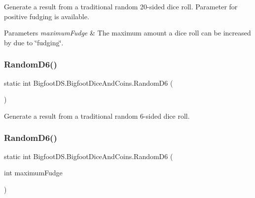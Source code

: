Generate a result from a traditional random 20-\/sided dice roll. Parameter for positive fudging is available. 


\begin{DoxyParams}{Parameters}
{\em maximum\+Fudge} & The maximum amount a dice roll can be increased by due to \char`\"{}fudging\char`\"{}.\\
\hline
\end{DoxyParams}
\mbox{\label{class_bigfoot_d_s_1_1_bigfoot_dice_and_coins_a20ea91b7328f0a2b36e5992ee9a0ccbb}} 
\subsubsection{\texorpdfstring{Random\+D6()}{RandomD6()}\hspace{0.1cm}{\footnotesize\ttfamily [1/2]}}
{\footnotesize\ttfamily static int Bigfoot\+D\+S.\+Bigfoot\+Dice\+And\+Coins.\+Random\+D6 (\begin{DoxyParamCaption}{ }\end{DoxyParamCaption})\hspace{0.3cm}{\ttfamily [static]}}



Generate a result from a traditional random 6-\/sided dice roll. 

\mbox{\label{class_bigfoot_d_s_1_1_bigfoot_dice_and_coins_aa9c2e1c718f8bd992bcd0cf9db877133}} 
\subsubsection{\texorpdfstring{Random\+D6()}{RandomD6()}\hspace{0.1cm}{\footnotesize\ttfamily [2/2]}}
{\footnotesize\ttfamily static int Bigfoot\+D\+S.\+Bigfoot\+Dice\+And\+Coins.\+Random\+D6 (\begin{DoxyParamCaption}\item[{int}]{maximum\+Fudge }\end{DoxyParamCaption})\hspace{0.3cm}{\ttfamily [static]}}



